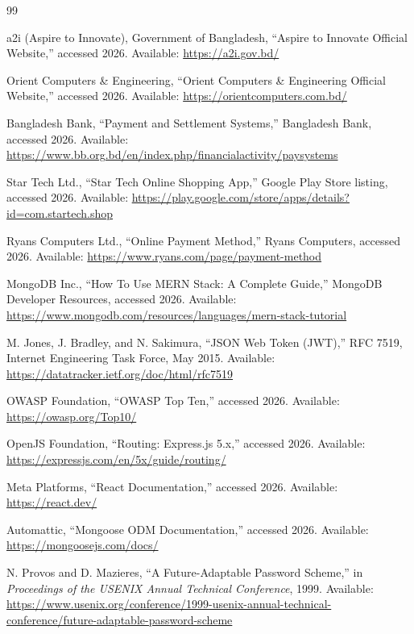 \documentclass[12pt,a4paper,oneside]{report}
\begin{document}
\newpage
\begin{thebibliography}{99}

a2i (Aspire to Innovate), Government of Bangladesh, ``Aspire to Innovate Official Website,'' accessed 2026. Available: \url{https://a2i.gov.bd/}

Orient Computers \& Engineering, ``Orient Computers \& Engineering Official Website,'' accessed 2026. Available: \url{https://orientcomputers.com.bd/}

Bangladesh Bank, ``Payment and Settlement Systems,'' Bangladesh Bank, accessed 2026. Available: \url{https://www.bb.org.bd/en/index.php/financialactivity/paysystems}

Star Tech Ltd., ``Star Tech Online Shopping App,'' Google Play Store listing, accessed 2026. Available: \url{https://play.google.com/store/apps/details?id=com.startech.shop}

Ryans Computers Ltd., ``Online Payment Method,'' Ryans Computers, accessed 2026. Available: \url{https://www.ryans.com/page/payment-method}

MongoDB Inc., ``How To Use MERN Stack: A Complete Guide,'' MongoDB Developer Resources, accessed 2026. Available: \url{https://www.mongodb.com/resources/languages/mern-stack-tutorial}

M. Jones, J. Bradley, and N. Sakimura, ``JSON Web Token (JWT),'' RFC 7519, Internet Engineering Task Force, May 2015. Available: \url{https://datatracker.ietf.org/doc/html/rfc7519}

OWASP Foundation, ``OWASP Top Ten,'' accessed 2026. Available: \url{https://owasp.org/Top10/}

OpenJS Foundation, ``Routing: Express.js 5.x,'' accessed 2026. Available: \url{https://expressjs.com/en/5x/guide/routing/}

Meta Platforms, ``React Documentation,'' accessed 2026. Available: \url{https://react.dev/}

Automattic, ``Mongoose ODM Documentation,'' accessed 2026. Available: \url{https://mongoosejs.com/docs/}

N. Provos and D. Mazieres, ``A Future-Adaptable Password Scheme,'' in \textit{Proceedings of the USENIX Annual Technical Conference}, 1999. Available: \url{https://www.usenix.org/conference/1999-usenix-annual-technical-conference/future-adaptable-password-scheme}

\end{thebibliography}
\end{document}
